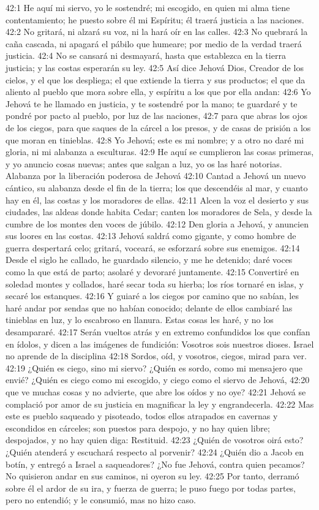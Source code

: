 42:1 He aquí mi siervo, yo le sostendré; mi escogido, en quien mi alma tiene contentamiento; he puesto sobre él mi Espíritu; él traerá justicia a las naciones. 
42:2 No gritará, ni alzará su voz, ni la hará oír en las calles. 
42:3 No quebrará la caña cascada, ni apagará el pábilo que humeare; por medio de la verdad traerá justicia. 
42:4 No se cansará ni desmayará, hasta que establezca en la tierra justicia; y las costas esperarán su ley. 
42:5 Así dice Jehová Dios, Creador de los cielos, y el que los despliega; el que extiende la tierra y sus productos; el que da aliento al pueblo que mora sobre ella, y espíritu a los que por ella andan: 
42:6 Yo Jehová te he llamado en justicia, y te sostendré por la mano; te guardaré y te pondré por pacto al pueblo, por luz de las naciones, 
42:7 para que abras los ojos de los ciegos, para que saques de la cárcel a los presos, y de casas de prisión a los que moran en tinieblas. 
42:8 Yo Jehová; este es mi nombre; y a otro no daré mi gloria, ni mi alabanza a esculturas. 
42:9 He aquí se cumplieron las cosas primeras, y yo anuncio cosas nuevas; antes que salgan a luz, yo os las haré notorias. 
Alabanza por la liberación poderosa de Jehová 
42:10 Cantad a Jehová un nuevo cántico, su alabanza desde el fin de la tierra; los que descendéis al mar, y cuanto hay en él, las costas y los moradores de ellas. 
42:11 Alcen la voz el desierto y sus ciudades, las aldeas donde habita Cedar; canten los moradores de Sela, y desde la cumbre de los montes den voces de júbilo. 
42:12 Den gloria a Jehová, y anuncien sus loores en las costas. 
42:13 Jehová saldrá como gigante, y como hombre de guerra despertará celo; gritará, voceará, se esforzará sobre sus enemigos. 
42:14 Desde el siglo he callado, he guardado silencio, y me he detenido; daré voces como la que está de parto; asolaré y devoraré juntamente. 
42:15 Convertiré en soledad montes y collados, haré secar toda su hierba; los ríos tornaré en islas, y secaré los estanques. 
42:16 Y guiaré a los ciegos por camino que no sabían, les haré andar por sendas que no habían conocido; delante de ellos cambiaré las tinieblas en luz, y lo escabroso en llanura. Estas cosas les haré, y no los desampararé. 
42:17 Serán vueltos atrás y en extremo confundidos los que confían en ídolos, y dicen a las imágenes de fundición: Vosotros sois nuestros dioses. 
Israel no aprende de la disciplina 
42:18 Sordos, oíd, y vosotros, ciegos, mirad para ver. 
42:19 ¿Quién es ciego, sino mi siervo? ¿Quién es sordo, como mi mensajero que envié? ¿Quién es ciego como mi escogido, y ciego como el siervo de Jehová, 
42:20 que ve muchas cosas y no advierte, que abre los oídos y no oye? 
42:21 Jehová se complació por amor de su justicia en magnificar la ley y engrandecerla. 
42:22 Mas este es pueblo saqueado y pisoteado, todos ellos atrapados en cavernas y escondidos en cárceles; son puestos para despojo, y no hay quien libre; despojados, y no hay quien diga: Restituid. 
42:23 ¿Quién de vosotros oirá esto? ¿Quién atenderá y escuchará respecto al porvenir? 
42:24 ¿Quién dio a Jacob en botín, y entregó a Israel a saqueadores? ¿No fue Jehová, contra quien pecamos? No quisieron andar en sus caminos, ni oyeron su ley. 
42:25 Por tanto, derramó sobre él el ardor de su ira, y fuerza de guerra; le puso fuego por todas partes, pero no entendió; y le consumió, mas no hizo caso. 
